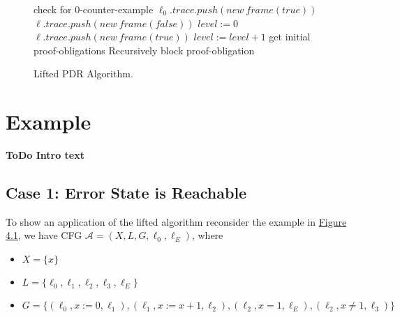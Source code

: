 \documentclass[11pt, a4paper, BCOR=10mm, ngerman]{scrbook}
\begin{document}
\begin{figure}[H]
\begin{algorithm}[H] 

\begin{algorithmic}[1]
\State check for 0-counter-example
\State $\ell_0.trace.push(new\ frame(true))$
        \State $\ell.trace.push(new\ frame(false))$
\EndFor
\State $level := 0$
\Statex
\Loop
                \State $\ell.trace.push(new\ frame(true))$
        \EndFor
        \State $level:= level + 1$
        \State get initial proof-obligations 
        \Statex
        \State Recursively block proof-obligation
        \EndIf
        \EndWhile

        \Statex 
                        \EndIf
                \EndFor
        \EndFor
\EndLoop
\EndProcedure
\end{algorithmic}
\end{algorithm}
\caption{Lifted PDR Algorithm.}
\end{figure}

\section{Example}
\textbf{ToDo Intro text}
\subsection{Case 1: Error State is Reachable}
To show an application of the lifted algorithm reconsider the example in \hyperref[ex7]{Figure 4.1}, we have CFG  $\mathcal{A} = (X, L, G, \ell_0, \ell_E)$, where
\begin{itemize}
\item $X = \{x\}$
\item $L = \{\ell_0, \ell_1, \ell_2, \ell_3, \ell_E\}$
\item $G = \{(\ell_0, x := 0, \ell_1), (\ell_1, x := x + 1, \ell_2), (\ell_2, x = 1, \ell_E), (\ell_2, x \neq 1, \ell_3) \}$
\end{itemize}
\end{document}
